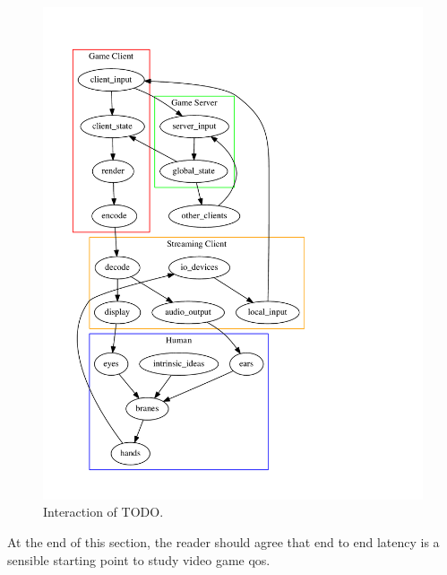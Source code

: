 \begin{figure}
  \centering
  \includegraphics[width=1.0\columnwidth]{../models/cycle.pdf}
  \caption{Interaction of TODO.}
  \label{fig:component-model}
\end{figure}

At the end of this section, the reader should agree that end to end latency is a sensible starting point to study video game qos.
